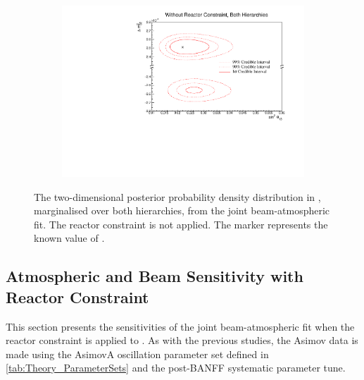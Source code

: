 \begin{figure}[h]
  \begin{subfigure}[t]{0.98\textwidth}
    \includegraphics[width=\textwidth, trim={0mm 0mm 0mm 0mm}, clip,page=1]{Figures/OA/JointFit/Contours_2D_th13_dm32_BH_0_woRC_UnSmeared_CredibleInterval.pdf}
  \end{subfigure}
  \caption{The two-dimensional posterior probability density distribution in , marginalised over both hierarchies, from the joint beam-atmospheric fit. The reactor constraint is not applied. The marker represents the known value of .}
  \label{fig:OscillationAnalysis_JointFit_DM32TH13}
\end{figure}

\clearpage
\subsection{Atmospheric and Beam Sensitivity with Reactor Constraint}
\label{sec:OscillationAnalysis_JointFit_wRC}

This section presents the sensitivities of the joint beam-atmospheric fit when the reactor constraint is applied to . As with the previous studies, the Asimov data is made using the AsimovA oscillation parameter set defined in \autoref{tab:Theory_ParameterSets} and the post-BANFF systematic parameter tune.
  

